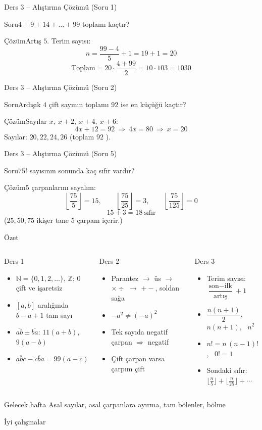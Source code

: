 \documentclass[aspectratio=169,11pt,handout]{beamer}
\newcommand{\soru}[3]{%
\begin{frame}{#1}
  \begin{block}{Soru}\large #2\end{block}
  \pause
  \begin{exampleblock}{Çözüm}\large #3\end{exampleblock}
\end{frame}}
\newcommand{\ab}[1]{\overline{#1}}
\begin{document}
\soru{Ders 3 -- Alıştırma Çözümü (Soru 1)}
{\(4+9+14+\dots+99\) toplamı kaçtır?}
{Artış \(5\). Terim sayısı:
\[n=\frac{99-4}{5}+1=19+1=20\]
\[\text{Toplam}=20\cdot\frac{4+99}{2}=10\cdot 103=1030\]}

\soru{Ders 3 -- Alıştırma Çözümü (Soru 2)}
{Ardışık \(4\) çift sayının toplamı \(92\) ise en küçüğü kaçtır?}
{Sayılar \(x,\ x+2,\ x+4,\ x+6\):
\[4x+12=92\ \Rightarrow\ 4x=80\ \Rightarrow\ x=20\]
Sayılar: \(20,22,24,26\) \quad (toplam \(92\) \checkmark).}

\soru{Ders 3 -- Alıştırma Çözümü (Soru 5)}
{\(75!\) sayısının sonunda kaç sıfır vardır?}
{\(5\) çarpanlarını sayalım:
\[\left\lfloor\frac{75}{5}\right\rfloor=15,\qquad \left\lfloor\frac{75}{25}\right\rfloor=3,\qquad \left\lfloor\frac{75}{125}\right\rfloor=0\]
\[15+3=18\ \text{sıfır}\]
(\(25,50,75\) ikişer tane \(5\) çarpanı içerir.)}

\begin{frame}{Özet}
\begin{columns}[t]
\begin{block}{Ders 1}
\begin{itemize}
\item \(\mathbb{N}=\{0,1,2,\dots\}\), \(\mathbb{Z}\); \(0\) çift ve işaretsiz
\item \([a,b]\) aralığında \(b-a+1\) tam sayı
\item \(\ab{ab}\pm\ab{ba}\): \(11(a+b)\), \(9(a-b)\)
\item \(\ab{abc}-\ab{cba}=99(a-c)\)
\end{itemize}
\end{block}
\begin{block}{Ders 2}
\begin{itemize}
\item Parantez \(\to\) üs \(\to\) \(\times\div\) \(\to\) \(+-\), soldan sağa
\item \(-a^2\neq(-a)^2\)
\item Tek sayıda negatif çarpan \(\Rightarrow\) negatif
\item Çift çarpan varsa çarpım çift
\end{itemize}
\end{block}
\begin{block}{Ders 3}
\begin{itemize}
\item Terim sayısı: \(\dfrac{\text{son}-\text{ilk}}{\text{artış}}+1\)
\item \(\dfrac{n(n+1)}{2}\), \ \(n(n+1)\), \ \(n^2\)
\item \(n!=n\,(n-1)!\), \ \(0!=1\)
\item Sondaki sıfır: \(\lfloor\frac{n}{5}\rfloor+\lfloor\frac{n}{25}\rfloor+\cdots\)
\end{itemize}
\end{block}
\end{columns}
\vspace{6pt}
\begin{alertblock}{Gelecek hafta}
Asal sayılar, asal çarpanlara ayırma, tam bölenler, bölme
\end{alertblock}
\end{frame}

\begin{frame}
\centering\Large İyi çalışmalar
\end{frame}
\end{document}
